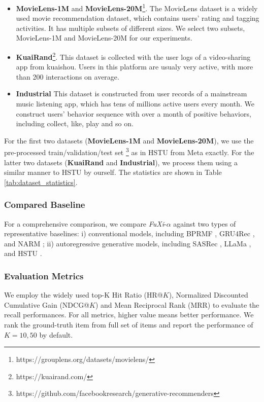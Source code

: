 \begin{itemize}[leftmargin=*,align=left]
  \item \textbf{MovieLens-1M} and \textbf{MovieLens-20M}\footnote{https://grouplens.org/datasets/movielens/}. 
    The MovieLens dataset is a widely used movie recommendation dataset, which contains users' rating and tagging activities.
    It has multiple subsets of different sizes.
    We select two subsets, MovieLens-1M and MovieLens-20M for our experiments.
  \item \textbf{KuaiRand}\footnote{https://kuairand.com/}. 
    This dataset is collected with the user logs of a video-sharing app from kuaishou.
    Users in this platform are usualy very active, with more than 200 interactions on average.
  \item \textbf{Industrial} 
    This dataset is constructed from user records of a mainstream music listening app, which has tens of millions active users every month.
    We construct users' behavior sequence with over a month of positive behaviors, including collect, like, play and so on.
\end{itemize}
For the first two datasets (\textbf{MovieLens-1M} and \textbf{MovieLens-20M}), we use the pre-processed train/validation/test set \footnote{https://github.com/facebookresearch/generative-recommenders} as in HSTU \cite{zhai2024actions} from Meta exactly.
For the latter two datasets (\textbf{KuaiRand} and \textbf{Industrial}), we process them using a similar manner to HSTU \cite{zhai2024actions} by ourself.
The statistics are shown in Table \ref{tab:dataset_statistics}. 


\subsubsection{Compared Baseline}
For a comprehensive comparison, we compare \textit{FuXi}-$\alpha$ against two types of representative baselines: 
i) conventional models, including BPRMF \cite{rendle2012bpr}, GRU4Rec \cite{hidasi2015session}, and NARM \cite{li2017neural}; ii) autoregressive generative models, including SASRec \cite{kang2018self}, LLaMa \cite{dubey2024llama}, and HSTU \cite{zhai2024actions}.


\subsubsection{Evaluation Metrics}
We employ the widely used top-K Hit Ratio (HR@$K$), Normalized Discounted Cumulative
Gain (NDCG@$K$) and Mean Reciprocal Rank (MRR) to evaluate the recall performances.
For all metrics, higher value means better performance. 
We rank the ground-truth item from full set of items and report the performance of $K = 10, 50$ by default.

